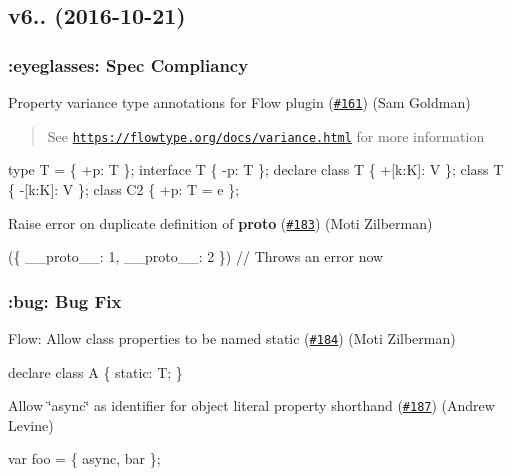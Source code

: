 \subsection*{v6.. (2016-\/10-\/21)}

\subsubsection*{\+:eyeglasses\+: Spec Compliancy}

Property variance type annotations for Flow plugin (\href{https://github.com/babel/babylon/pull/161}{\tt \#161}) (Sam Goldman)

\begin{quote}
See \href{https://flowtype.org/docs/variance.html}{\tt https\+://flowtype.\+org/docs/variance.\+html} for more information \end{quote}



\begin{DoxyCode}
type T = \{ +p: T \};
interface T \{ -p: T \};
declare class T \{ +[k:K]: V \};
class T \{ -[k:K]: V \};
class C2 \{ +p: T = e \};
\end{DoxyCode}


Raise error on duplicate definition of {\bfseries proto} (\href{https://github.com/babel/babylon/pull/183}{\tt \#183}) (Moti Zilberman)


\begin{DoxyCode}
(\{ \_\_proto\_\_: 1, \_\_proto\_\_: 2 \}) // Throws an error now
\end{DoxyCode}


\subsubsection*{\+:bug\+: Bug Fix}

Flow\+: Allow class properties to be named {\ttfamily static} (\href{https://github.com/babel/babylon/pull/184}{\tt \#184}) (Moti Zilberman)


\begin{DoxyCode}
declare class A \{
  static: T;
\}
\end{DoxyCode}


Allow \char`\"{}async\char`\"{} as identifier for object literal property shorthand (\href{https://github.com/babel/babylon/pull/187}{\tt \#187}) (Andrew Levine)


\begin{DoxyCode}
var foo = \{ async, bar \};
\end{DoxyCode}



